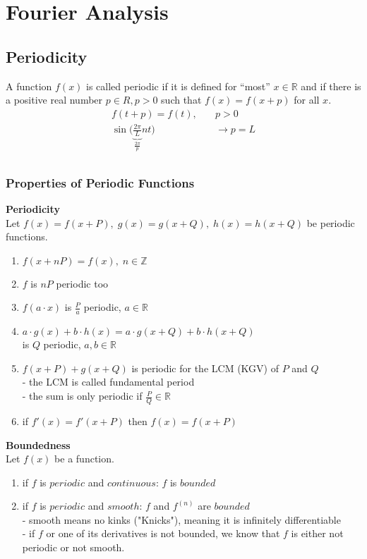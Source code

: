 \section{Fourier Analysis}

\subsection{Periodicity}
A function $f(x)$ is called periodic if it is defined for “most” $x \in \mathbb{R} $ and if there is a positive real number $p \in R, p > 0$ such that $f(x) = f(x+p)$ for all $x$.
\begin{align*}
    f(t+p)=f(t),\quad                                                  & p>0             \\
    \sin\biggl( \underbrace{\frac{2\pi}{L}}_{\frac{2\pi}{p}}nt \biggr) & \rightarrow p=L \\
\end{align*}
\subsubsection{Properties of Periodic Functions}
\textbf{Periodicity}\\
Let $f(x)=f(x+P),\; g(x)=g(x+Q),\; h(x)=h(x+Q)$ be periodic functions.
\begin{enumerate}
    \item $f(x+nP)=f(x),\; n\in\mathbb{Z}$
    \item $f$ is $nP$ periodic too
    \item $f(a\cdot x)$ is $\frac{P}{a}$ periodic, $a \in \mathbb{R}$
    \item $a\cdot g(x)+b\cdot h(x)=a\cdot g(x+Q)+b\cdot h(x+Q)$ \\is $Q$ periodic, $a, b \in \mathbb{R}$
    \item $f(x+P)+g(x+Q)$ is periodic for the LCM (KGV) of $P$ and $Q$\\ 
    - the LCM is called fundamental period \\ 
    - the sum is only periodic if $\frac{P}{Q}\in \mathbb{R}$
    \item if $f'(x)=f'(x+P)$ then $f(x)=f(x+P)$ 
\end{enumerate}
\textbf{Boundedness}\\
Let $f(x)$ be a function.
\begin{enumerate}
    \item if $f$ is $periodic$ and $continuous$: $f$ is $bounded$ 
    \item if $f$ is $periodic$ and $smooth$: $f$ and $f^{(n)}$ are $bounded$\\ 
    - smooth means no kinks ("Knicks"), meaning it is infinitely differentiable\\ 
    - if $f$ or one of its derivatives is not bounded, we know that $f$ is either not periodic or not smooth.
\end{enumerate}

